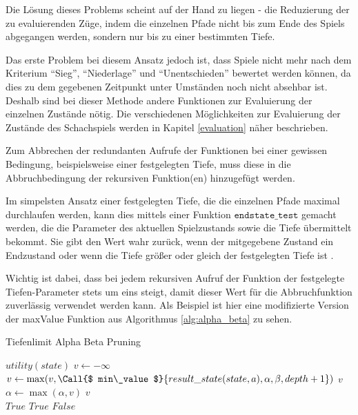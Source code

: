 
Die Lösung dieses Problems scheint auf der Hand zu liegen - die Reduzierung der zu evaluierenden Züge, indem die einzelnen Pfade nicht bis zum Ende des Spiels abgegangen werden, sondern nur bis zu einer bestimmten Tiefe.

Das erste Problem bei diesem Ansatz jedoch ist, dass Spiele nicht mehr nach dem Kriterium ``Sieg'', ``Niederlage'' und ``Unentschieden'' bewertet werden können, da dies zu dem gegebenen Zeitpunkt unter Umständen noch nicht absehbar ist. Deshalb sind bei dieser Methode andere Funktionen zur Evaluierung der einzelnen Zustände nötig. Die verschiedenen Möglichkeiten zur Evaluierung der Zustände des Schachspiels werden in Kapitel \ref{evaluation} näher beschrieben.

Zum Abbrechen der redundanten Aufrufe der Funktionen bei einer gewissen Bedingung, beispielsweise einer festgelegten Tiefe, muss diese in die Abbruchbedingung der rekursiven Funktion(en) hinzugefügt werden. 

Im simpelsten Ansatz einer festgelegten Tiefe, die die einzelnen Pfade maximal durchlaufen werden, kann dies mittels einer Funktion $\mathtt{endstate\_test}$ gemacht werden, die die Parameter des aktuellen Spielzustands sowie die Tiefe übermittelt bekommt. Sie gibt den Wert wahr zurück, wenn der mitgegebene Zustand ein Endzustand oder wenn die Tiefe größer oder gleich der festgelegten Tiefe ist \cite{Russell2010}.

Wichtig ist dabei, dass bei jedem rekursiven Aufruf der Funktion der festgelegte Tiefen-Parameter stets um eins steigt, damit dieser Wert für die Abbruchfunktion zuverlässig verwendet werden kann. Als Beispiel ist hier eine modifizierte Version der maxValue Funktion aus Algorithmus \ref{alg:alpha_beta} zu sehen.

\begin{algorithm}[h]
\caption{Tiefenlimit Alpha Beta Pruning \cite{Russell2010}}
\label{alg:depth_limit}
\begin{algorithmic}
 \State \Return $ utility(state) $ \EndIf
\State $ v  \gets -\infty$
\State $ v  \gets \max( v , \Call{$ min\_value $}{ result\_state(state, a) , \alpha, \beta,  depth  + 1})$
 \State \Return $ v $ \EndIf
\State $\alpha \gets \max(\alpha,  v )$
\EndFor
\State \Return $ v $
\EndFunction
\\
 \State \Return $True$ \EndIf
{} \State \Return $True$ \EndIf
\State \Return $False$
\EndFunction 
\end{algorithmic}
\end{algorithm}

